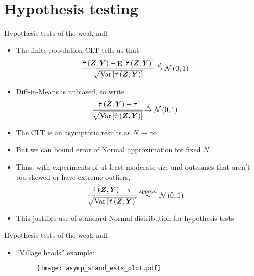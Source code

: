 \documentclass[table, xcolor = {dvipsnames}, 9pt]{beamer}
\theoremstyle{plain}
\DeclareMathOperator{\E}{\rm{E}}
\DeclareMathOperator{\Var}{\rm{Var}}
\begin{document}
\section{Hypothesis testing}
\begin{frame}{Hypothesis tests of the weak null}
\begin{itemize}
\item The finite population CLT tells us that
\begin{align*}
\cfrac{\hat{\tau}\left(\bm{Z}, \bm{Y}\right) - \E\left[\hat{\tau}\left(\bm{Z}, \bm{Y}\right)\right]}{\sqrt{\Var\left[\hat{\tau}\left(\bm{Z}, \bm{Y}\right)\right]}} & \overset{d}{\to} \mathcal{N}\left(0, 1\right)
\end{align*}  \pause
\item Diff-in-Means is unbiased, so write
\begin{align*}
\cfrac{\hat{\tau}\left(\bm{Z}, \bm{Y}\right) - \tau}{\sqrt{\Var\left[\hat{\tau}\left(\bm{Z}, \bm{Y}\right)\right]}} & \overset{d}{\to} \mathcal{N}\left(0, 1\right)
\end{align*} \pause
\item The CLT is an asymptotic results as $N \to \infty$
\item But we can bound error of Normal approximation for fixed $N$ \pause
\item Thus, with experiments of at least moderate size and outcomes that aren't too skewed or have extreme outliers,
\begin{align*}
\cfrac{\hat{\tau}\left(\bm{Z}, \bm{Y}\right) - \tau}{\sqrt{\Var\left[\hat{\tau}\left(\bm{Z}, \bm{Y}\right)\right]}} & \overset{\text{approx.}}{\sim} \mathcal{N}\left(0, 1\right)
\end{align*} \pause
\item This justifies use of standard Normal distribution for hypothesis tests
\end{itemize}
\end{frame}
\begin{frame}{Hypothesis tests of the weak null}
\vfill
\begin{itemize} \vfill
\item ``Village heads'' example: \vfill
\begin{figure}[H]
\texttt{[image: asymp\_stand\_ests\_plot.pdf]}
\end{figure}
\end{itemize}
\vfill
\end{frame}
\end{document}
